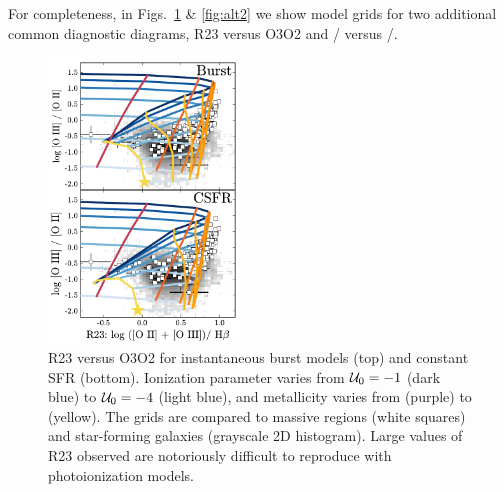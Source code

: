 For completeness, in Figs.~\ref{fig:alt1} \& \ref{fig:alt2} we show model grids for two additional common diagnostic diagrams, R23 versus O3O2 and \sii{}/\ha{} versus \oiii{}/\hb{}.
\begin{figure}[!htbp]
  \begin{centering}
    \includegraphics[width=0.45\textwidth]{manuscript/chapter2/f21.pdf}
    \caption{R23 versus O3O2 for instantaneous burst models (top) and constant SFR (bottom). Ionization parameter varies from $\mathcal{U}_{0}=-1$ (dark blue) to $\mathcal{U}_{0}=-4$ (light blue), and metallicity varies from  (purple) to  (yellow). The grids are compared to massive \hii regions (white squares) and star-forming galaxies (grayscale 2D histogram). Large values of R23 observed are notoriously difficult to reproduce with photoionization models.}
    \label{fig:alt1}
  \end{centering}
\end{figure}
